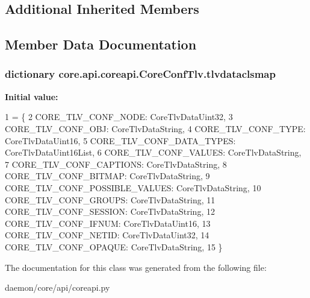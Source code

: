 \subsection*{Additional Inherited Members}


\subsection{Member Data Documentation}
\hypertarget{classcore_1_1api_1_1coreapi_1_1_core_conf_tlv_a20158fbe8221bf15d311aeb8dc0988e4}{
\subsubsection[{tlvdataclsmap}]{\setlength{\rightskip}{0pt plus 5cm}dictionary core.\+api.\+coreapi.\+Core\+Conf\+Tlv.\+tlvdataclsmap\hspace{0.3cm}{\ttfamily [static]}}}\label{classcore_1_1api_1_1coreapi_1_1_core_conf_tlv_a20158fbe8221bf15d311aeb8dc0988e4}
{\bfseries Initial value\+:}
\begin{DoxyCode}
1 = \{
2         CORE\_TLV\_CONF\_NODE: CoreTlvDataUint32,
3         CORE\_TLV\_CONF\_OBJ: CoreTlvDataString,
4         CORE\_TLV\_CONF\_TYPE: CoreTlvDataUint16,
5         CORE\_TLV\_CONF\_DATA\_TYPES: CoreTlvDataUint16List,
6         CORE\_TLV\_CONF\_VALUES: CoreTlvDataString,
7         CORE\_TLV\_CONF\_CAPTIONS: CoreTlvDataString,
8         CORE\_TLV\_CONF\_BITMAP: CoreTlvDataString,
9         CORE\_TLV\_CONF\_POSSIBLE\_VALUES: CoreTlvDataString,
10         CORE\_TLV\_CONF\_GROUPS: CoreTlvDataString,
11         CORE\_TLV\_CONF\_SESSION: CoreTlvDataString,
12         CORE\_TLV\_CONF\_IFNUM: CoreTlvDataUint16,
13         CORE\_TLV\_CONF\_NETID: CoreTlvDataUint32,
14         CORE\_TLV\_CONF\_OPAQUE: CoreTlvDataString, 
15     \}
\end{DoxyCode}


The documentation for this class was generated from the following file\+:\begin{DoxyCompactItemize}
\item 
daemon/core/api/coreapi.\+py\end{DoxyCompactItemize}
